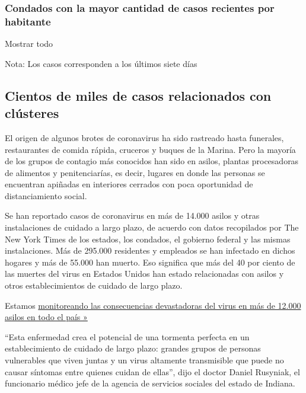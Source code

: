 \hypertarget{condados-con-la-mayor-cantidad-de-casos-recientes-por-habitante}{%
\subsubsection{Condados con la mayor cantidad de casos recientes por
habitante}\label{condados-con-la-mayor-cantidad-de-casos-recientes-por-habitante}}

Mostrar todo

Nota: Los casos corresponden a los últimos siete días

\hypertarget{cientos-de-miles-de-casos-relacionados-con-cluxfasteres}{%
\subsection{Cientos de miles de casos relacionados con
clústeres}\label{cientos-de-miles-de-casos-relacionados-con-cluxfasteres}}

El origen de algunos brotes de coronavirus ha sido rastreado hasta
funerales, restaurantes de comida rápida, cruceros y buques de la
Marina. Pero la mayoría de los grupos de contagio más conocidos han sido
en asilos, plantas procesadoras de alimentos y penitenciarías, es decir,
lugares en donde las personas se encuentran apiñadas en interiores
cerrados con poca oportunidad de distanciamiento social.

Se han reportado casos de coronavirus en más de 14.000 asilos y otras
instalaciones de cuidado a largo plazo, de acuerdo con datos recopilados
por The New York Times de los estados, los condados, el gobierno federal
y las mismas instalaciones. Más de 295.000 residentes y empleados se han
infectado en dichos hogares y más de 55.000 han muerto. Eso significa
que más del 40 por ciento de las muertes del virus en Estados Unidos han
estado relacionadas con asilos y otros establecimientos de cuidado de
largo plazo.

Estamos
\href{https://www.nytimes3xbfgragh.onion/interactive/2020/us/coronavirus-nursing-homes.html}{monitoreando
las consecuencias devastadoras del virus en más de 12.000 asilos en todo
el país »}

``Esta enfermedad crea el potencial de una tormenta perfecta en un
establecimiento de cuidado de largo plazo: grandes grupos de personas
vulnerables que viven juntas y un virus altamente transmisible que puede
no causar síntomas entre quienes cuidan de ellas'', dijo el doctor
Daniel Rusyniak, el funcionario médico jefe de la agencia de servicios
sociales del estado de Indiana.

